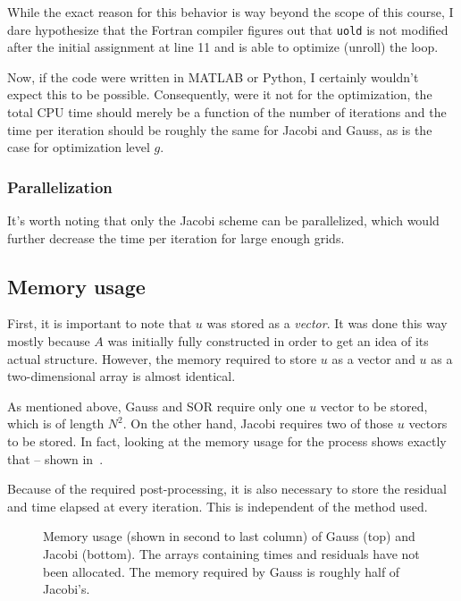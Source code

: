 \documentclass{SelimArticle}
\begin{document}
While the exact reason for this behavior is way beyond the scope of this course, I dare hypothesize
that the Fortran compiler figures out that \texttt{uold} is not modified after the initial
assignment at line 11 and is able to optimize (unroll) the loop.

Now, if the code were written in MATLAB or Python, I certainly wouldn't expect this to be possible.
Consequently, were it not for the optimization, the total CPU time should merely be a function of
the number of iterations and the time per iteration should be roughly the same for Jacobi and Gauss,
as is the case for optimization level $g$.

\subsubsection{Parallelization}
It's worth noting that only the Jacobi scheme can be parallelized, which would further decrease
the time per iteration for large enough grids.

\subsection{Memory usage}
First, it is important to note that $u$ was stored as a \textit{vector}. It was done this way mostly
because $A$ was initially fully constructed in order to get an idea of its actual structure. However,
the memory required to store $u$ as a vector and $u$ as a two-dimensional array is almost identical.

As mentioned above, Gauss and SOR require only one $u$ vector to be stored, which is of length $N^2$. On
the other hand, Jacobi requires two of those $u$ vectors to be stored. In fact, looking at the memory usage
for the process shows exactly that -- shown in~.

Because of the required post-processing, it is also necessary to store the residual and time elapsed at
every iteration. This is independent of the method used.
\begin{figure}[H]
    \centering
    \caption{Memory usage (shown in second to last column) of Gauss (top) and Jacobi (bottom).
        The arrays containing times and residuals have not been allocated.
        The memory required by Gauss is roughly half of Jacobi's.}
    \label{fig:memusage}
\end{figure}
\end{document}
